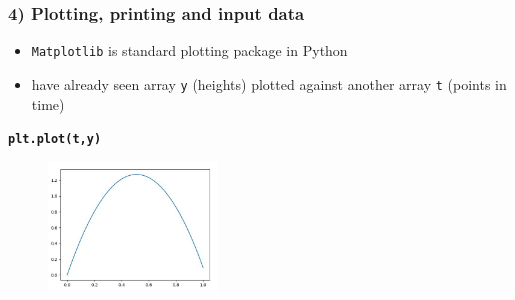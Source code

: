 \documentclass[14pt]{beamer}
\newcommand\blue[1]{{\color{blue} #1}}
\begin{document}

\begin{frame}[fragile]
\frametitle{4) Plotting, printing and input data}

\begin{itemize}
	\item \texttt{Matplotlib} is standard plotting package in Python
	\item have already seen array \texttt{y} (heights) plotted against another array \texttt{t} (points in time) 
\end{itemize}
\vspace*{-6mm}
\begin{center}
{\small\blue{
\textbf{
\texttt{plt.plot(t,y)}}}
}
\end{center}
\vspace*{-8mm}
\begin{figure}[ht]
	\centering
	\includegraphics[width=0.4\textwidth]{figures/LLp22a}
\end{figure}

\end{frame}

\end{document}
